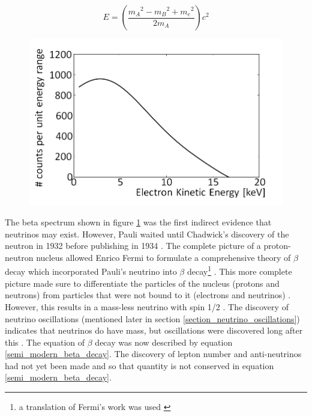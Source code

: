 \begin{equation}
    E = \left( \frac{{m_A}^2 - {m_B}^2 + {m_e}^2}{2m_A}\right) c^2
    \label{constant_ke_e_equation}
\end{equation}

\begin{figure}[!h]
 \centering
 \includegraphics[width=0.7\linewidth]{Chapter1/Figs/Raster/betaSpectrum.png}
 \label{fig:beta_spectrum}
\end{figure}

The beta spectrum shown in figure \ref{fig:beta_spectrum} was the first indirect evidence that neutrinos may exist. However, Pauli waited until Chadwick's discovery of the neutron in 1932 \cite{chadwick1932possible} before publishing in 1934 \cite{lederman1970resource}. The complete picture of a proton-neutron nucleus allowed Enrico Fermi to formulate a comprehensive theory of $\beta$ decay which incorporated Pauli's neutrino into $\beta$ decay\footnote{a translation of Fermi's work was used \cite{wilson1968fermi}} \cite{lederman1970resource} \cite{Fermi:1934hr}. This more complete picture made sure to differentiate the particles of the nucleus (protons and neutrons) from particles that were not bound to it (electrons and neutrinos) \cite{Fermi:1934hr} \cite{wilson1968fermi}. However, this results in a mass-less neutrino with spin 1/2 \cite{lederman1970resource}. The discovery of neutrino oscillations (mentioned later in section \ref{section_neutrino_oscillations}) indicates that neutrinos do have mass, but oscillations were discovered long after this \cite{griffiths2008book} \cite{griffiths2008neutrino1.5}. The equation of $\beta$ decay was now described by equation \ref{semi_modern_beta_decay}. The discovery of lepton number and anti-neutrinos had not yet been made and so that quantity is not conserved in equation \ref{semi_modern_beta_decay}. 

